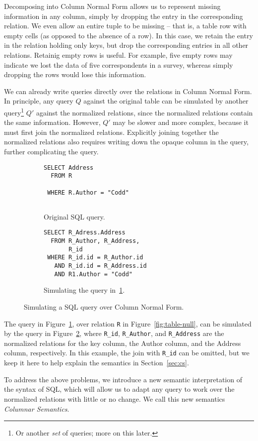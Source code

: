 \documentclass[sigconf,nonacm]{acmart}
\begin{document}
Decomposing into Column Normal Form allows us to
 represent missing information in any column,
 simply by dropping the entry in the corresponding relation.
We even allow an entire tuple to be missing --
 that is, a table row with empty cells (as opposed to the absence of a row).
In this case, we retain the entry in the relation holding only keys, 
 but drop the corresponding entries in all other relations.
Retainig empty rows is useful.
For example, five empty rows may indicate we lost the data
 of five correspondents in a survey, 
 whereas simply dropping the rows would lose this information.

We can already write queries directly over the relations in Column Normal Form. 
In principle, any query $Q$ against the original table 
 can be simulated by another query\footnote{Or another {\em set} of queries; more on this later.}
 $Q'$ against the normalized relations, 
 since the normalized relations contain the same information.
However, $Q'$ may be slower and more complex,
 because it must first join the normalized relations.
Explicitly joining together the normalized relations
 also requires writing down the opaque column
 in the query, further complicating the query.

\begin{figure}
\begin{subfigure}[t]{0.4\linewidth}
\begin{lstlisting}[showlines=true]
SELECT Address 
  FROM R 

 WHERE R.Author = "Codd"


\end{lstlisting}
\caption{Original SQL query.}
\label{fig:codd}
\end{subfigure}
\;
\begin{subfigure}[t]{0.5\linewidth}
\begin{lstlisting}
SELECT R_Adress.Address 
  FROM R_Author, R_Address,
       R_id
 WHERE R_id.id = R_Author.id 
   AND R_id.id = R_Address.id
   AND R1.Author = "Codd"
\end{lstlisting}
\caption{Simulating the query in~\ref{fig:codd}.}
\label{fig:codd-simulate}
\end{subfigure}
\caption{Simulating a SQL query over Column Normal Form.}
\label{fig:simulate}
\end{figure}

\begin{example}
\label{ex:cnf-query}  
The query in Figure~\ref{fig:codd},
 over relation \lstinline|R| in Figure~\ref{fig:table-null},
 can be simulated by the query in Figure~\ref{fig:codd-simulate},
 where \lstinline|R_id|, \lstinline|R_Author|, and \lstinline|R_Address|
 are the normalized relations for the key column, 
 the \textsf{Author} column, and the \textsf{Address} column, respectively.
In this example, the join with \lstinline|R_id| can be omitted, 
 but we keep it here to help explain the semantics in Section~\ref{sec:cs}.
\end{example}
To address the above problems, 
 we introduce a new semantic interpretation of the syntax of SQL,
 which will allow us to adapt any query to work over 
 the normalized relations with little or no change.
We call this new semantics {\em Columnar Semantics}.
\end{document}
